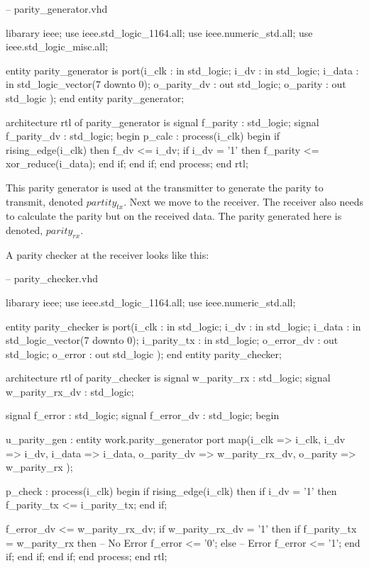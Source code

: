 \begin{VHDLlisting}[tabsize=8]
-- parity_generator.vhd

libarary ieee;
	use ieee.std_logic_1164.all;
	use ieee.numeric_std.all;
	use ieee.std_logic_misc.all;
	
entity parity_generator is
	port(i_clk       : in    std_logic;
		 i_dv        : in    std_logic;
		 i_data      : in    std_logic_vector(7 downto 0);
		 o_parity_dv :   out std_logic;
		 o_parity    :   out std_logic
	);
end entity parity_generator;

architecture rtl of parity_generator is
	signal f_parity    : std_logic;
	signal f_parity_dv : std_logic;
begin
	p_calc : process(i_clk)
	begin
		if rising_edge(i_clk) then
			f_dv <= i_dv;
			if i_dv = '1' then
				f_parity <= xor_reduce(i_data);
			end if;
		end if;	
	end process;
end rtl;
\end{VHDLlisting}

This parity generator is used at the transmitter to generate the parity to transmit, denoted $partity_{tx}$. Next we move to the receiver. The receiver also needs to calculate the parity but on the received data. The parity generated here is denoted, $parity_{rx}$.

A parity checker at the receiver looks like this:

\begin{VHDLlisting}[tabsize=8]
-- parity_checker.vhd

libarary ieee;
	use ieee.std_logic_1164.all;
	use ieee.numeric_std.all;
	
entity parity_checker is
	port(i_clk       : in    std_logic;
		 i_dv        : in    std_logic;
		 i_data      : in    std_logic_vector(7 downto 0);
		 i_parity_tx : in    std_logic;
		 o_error_dv  :   out std_logic;
		 o_error     :   out std_logic
	);
end entity parity_checker;

architecture rtl of parity_checker is
	signal w_parity_rx    : std_logic;
	signal w_parity_rx_dv : std_logic;
	
	signal f_error        : std_logic;
	signal f_error_dv     : std_logic;
begin
	
	u_parity_gen : entity work.parity_generator
	port map(i_clk          => i_clk,
	         i_dv           => i_dv,
	         i_data         => i_data,
	         o_parity_dv    => w_parity_rx_dv,
	         o_parity       => w_parity_rx
	);
	
	p_check : process(i_clk)
	begin
		if rising_edge(i_clk) then
			if i_dv = '1' then	
				f_parity_tx <= i_parity_tx;
			end if;
			
			f_error_dv <= w_parity_rx_dv;
			if w_parity_rx_dv = '1' then
				if f_parity_tx = w_parity_rx then
					-- No Error
					f_error <= '0';
				else
					-- Error
					f_error <= '1';
				end if;			
			end if;
		end if;	
	end process;
end rtl;
\end{VHDLlisting}

